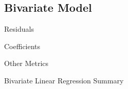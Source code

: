 \documentclass[11pt,a4paper]{article}
\begin{document}
\subsection{Bivariate Model}
\begin{table}[H]
    \centering
    \begin{subtable}{.7\linewidth}
        \centering
        \caption{Residuals}
    \end{subtable}%

    \vspace{1em} %

    \begin{subtable}{.7\linewidth}
        \centering
        \caption{Coefficients}
    \end{subtable}%

    \vspace{1em}

    

    \vspace{1em} %

    \begin{subtable}{.7\linewidth}
        \centering
        \caption{Other Metrics}
    \end{subtable}

    \caption{Bivariate Linear Regression Summary}
    \label{table: p2}
\end{table}
\end{document}
